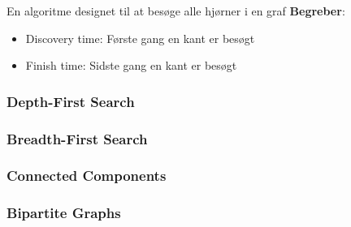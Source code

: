 En algoritme designet til at besøge alle hjørner i en graf
\textbf{Begreber}:
\begin{itemize}
	\item Discovery time: Første gang en kant er besøgt
	\item Finish time: Sidste gang en kant er besøgt
\end{itemize}

\subsubsection{Depth-First Search}


\subsubsection{Breadth-First Search}

\newpage

\subsubsection{Connected Components}


\subsubsection{Bipartite Graphs}
